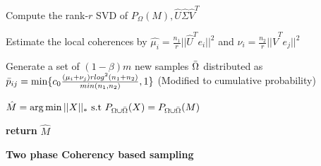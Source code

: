\documentclass{article}
\begin{document}
\begin{algorithm}[ht]

Compute the rank-$r$ SVD of   $P_{\Omega} (M), \hat{U} \hat{\Sigma} \hat{V}^T  $

Estimate the local coherences by $\hat{\mu_{i}} = \frac{n_1}{r}||\hat{U}^Te_i||^2 $
and $\hat{\nu_{i}} = \frac{n_2}{r}||\hat{V}^Te_j||^2 $

Generate a set of $(1-\beta)m$ new samples $\Bar{\Omega}$ distributed as $ \Bar{p}_{ij} = \min \{ c_0 \frac{(\mu_i + \nu_j)r log^2(n_1 + n_2)}{min(n_1,n_2)}, 1  \} $ (Modified to cumulative probability)

$ \hat{M} = \arg \min ||X||_{*} \text{ s.t } P_{\Omega \cup \Bar{\Omega}} (X) = P_{\Omega \cup \Bar{\Omega}} (M) $ \;

\textbf{return} $\hat{M}$ 
\caption{{\bf Two phase Coherency based sampling} \label{Algorithm two}}
\end{algorithm}
\end{document}
